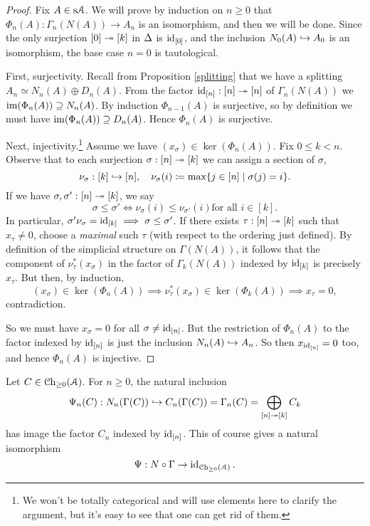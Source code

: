 \begin{proof}
  Fix $A \in \mathrm{s}\mathcal{A}$. We will prove by induction on $n \ge 0$ that
  $\Phi_n(A) : \Gamma_n(N(A)) \to A_n$ is an isomorphism, and then we
  will be done. Since the only surjection $[0] \twoheadrightarrow [k]$ in
  $\Delta$ is $\operatorname{id}_{[0]}$, and the inclusion $N_0(A) \hookrightarrow A_0$ is an
  isomorphism, the base case $n=0$ is tautological.

  First, surjectivity. Recall from Proposition \ref{splitting} that we
  have a splitting $A_n \simeq N_n(A) \oplus D_n(A)$. From the factor
  $\operatorname{id}_{[n]} : [n] \twoheadrightarrow [n]$ of $\Gamma_n(N(A))$ we $\operatorname{im}(\Phi_n(A))
  \supseteq N_n(A)$. By induction $\Phi_{n-1}(A)$ is surjective, so by
  definition we must have $\operatorname{im}(\Phi_n(A)) \supseteq D_n(A)$. Hence
  $\Phi_n(A)$ is surjective.

  Next, injectivity.\footnote{We won't be totally categorical and will
    use elements here to clarify the argument, but it's easy to see
    that one can get rid of them.} Assume we have $(x_\sigma) \in
  \ker(\Phi_n(A))$.  Fix $0 \le k < n$. Observe that to each
  surjection $\sigma : [n] \twoheadrightarrow [k]$ we can assign a section of
  $\sigma$,
  \[
  \nu_\sigma : [k] \hookrightarrow [n], \quad \nu_\sigma(i) \coloneqq \max\{j \in
     [n] \mid \sigma(j) = i\}.
  \]
  If we have $\sigma, \sigma' : [n] \twoheadrightarrow [k]$, we say
  \[
  \sigma \le \sigma' \iff \nu_\sigma(i) \le \nu_{\sigma'}(i) \text{
    for all } i \in [k].
  \]
  In particular, $\sigma'\nu_\sigma = \operatorname{id}_{[k]} \implies \sigma \le
  \sigma'$. If there exists $\tau : [n] \twoheadrightarrow [k]$ such that $x_\tau
  \ne 0$, choose a \textit{maximal} such $\tau$ (with respect to the
  ordering just defined). By definition of the simplicial structure on
  $\Gamma(N(A))$, it follows that the component of
  $\nu_\tau^*(x_\sigma)$ in the factor of $\Gamma_k(N(A))$ indexed by
  $\operatorname{id}_{[k]}$ is precisely $x_\tau$. But then, by induction,
  \[
  (x_\sigma) \in \ker(\Phi_n(A)) \implies \nu_\tau^*(x_\sigma) \in
  \ker(\Phi_k(A)) \implies x_\tau = 0,
  \]
  contradiction.

  So we must have $x_\sigma = 0$ for all $\sigma \ne \operatorname{id}_{[n]}$. But
  the restriction of $\Phi_n(A)$ to the factor indexed by $\operatorname{id}_{[n]}$
  is just the inclusion $N_n(A) \hookrightarrow A_n$. So then $x_{\operatorname{id}_{[n]}} = 0$
  too, and hence $\Phi_n(A)$ is injective.
\end{proof}

\begin{lemma}
  \label{n-gamma}
  Let $C \in {\mathcal{C}\mathrm{h}}_{\ge 0}(\mathcal{A})$. For $n \ge 0$, the natural inclusion
  \[
  \Psi_n(C) : N_n(\Gamma(C)) \hookrightarrow C_n(\Gamma(C)) = \Gamma_n(C) =
  \bigoplus_{[n] \twoheadrightarrow [k]} C_k
  \]
  has image the factor $C_n$ indexed by $\operatorname{id}_{[n]}$. This of course
  gives a natural isomorphism
  \[
  \Psi : N \circ \Gamma \to \operatorname{id}_{{\mathcal{C}\mathrm{h}}_{\ge 0}(\mathcal{A})}.
  \]
\end{lemma}

